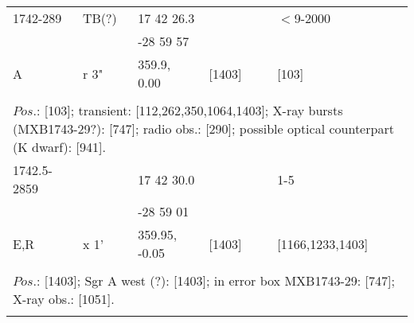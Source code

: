 \documentclass{aa}
\begin{document}
\begin{tabular}{p{2.5cm}p{1cm}p{1.8cm}p{2.3cm}p{3.3cm}p{2.0cm}p{2.2cm}}
\noalign{\smallskip}
1742-289        & TB(?)            & 17 42 26.3            &                         &                         & $<$9-2000   &       \\
                         &                        & -28 59 57             &                         &                         &                        &       \\
A                      & r 3"                & 359.9, 0.00          & [1403]             &                         & [103]             &       \\
\\ 
\multicolumn{7}{p{17.5cm}}{
$Pos$.: [103]; transient: [112,262,350,1064,1403]; X-ray bursts (MXB1743-29?): [747]; radio obs.: [290]; possible optical
counterpart (K dwarf): [941].}\\
\noalign{\smallskip}
\hline

\noalign{\smallskip}
1742.5-2859   &                   & 17 42 30.0            &                     &                         & 1-5                                 &       \\
                         &                    & -28 59 01             &                     &                          &                                        &      \\
E,R                  & x 1'            & 359.95, -0.05        & [1403]         &                         & [1166,1233,1403]        &       \\
\\
\multicolumn{7}{p{17.5cm}}{
$Pos$.: [1403]; Sgr A west (?): [1403]; in error box MXB1743-29: [747]; X-ray obs.: [1051].}\\
\noalign{\smallskip}
\hline

\end{tabular}
\end{document}
